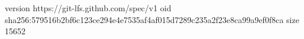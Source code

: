 version https://git-lfs.github.com/spec/v1
oid sha256:579516b2bf6c123ce294e4e7535af4af015d7289c235a2f23e8ca99a9ef0f8ca
size 15652
